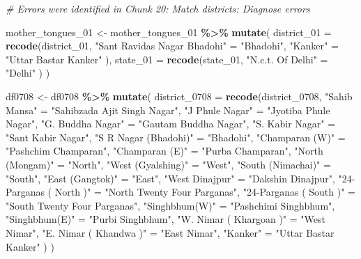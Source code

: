 \documentclass[
]{article}
\newenvironment{Shaded}{\begin{snugshade}}{\end{snugshade}}
\newcommand{\AttributeTok}[1]{\textcolor[rgb]{0.13,0.29,0.53}{#1}}
\newcommand{\CommentTok}[1]{\textcolor[rgb]{0.56,0.35,0.01}{\textit{#1}}}
\newcommand{\FunctionTok}[1]{\textcolor[rgb]{0.13,0.29,0.53}{\textbf{#1}}}
\newcommand{\NormalTok}[1]{#1}
\newcommand{\OtherTok}[1]{\textcolor[rgb]{0.56,0.35,0.01}{#1}}
\newcommand{\SpecialCharTok}[1]{\textcolor[rgb]{0.81,0.36,0.00}{\textbf{#1}}}
\newcommand{\StringTok}[1]{\textcolor[rgb]{0.31,0.60,0.02}{#1}}
\begin{document}
\begin{Shaded}
\begin{Highlighting}[]
\CommentTok{\# Errors were identified in Chunk 20: Match districts: Diagnose errors}

\NormalTok{mother\_tongues\_01 }\OtherTok{\textless{}{-}}\NormalTok{ mother\_tongues\_01 }\SpecialCharTok{\%\textgreater{}\%}
  \FunctionTok{mutate}\NormalTok{(}
    \AttributeTok{district\_01 =} \FunctionTok{recode}\NormalTok{(district\_01,}
      \StringTok{"Sant Ravidas Nagar Bhadohi"} \OtherTok{=} \StringTok{"Bhadohi"}\NormalTok{,}
      \StringTok{"Kanker"} \OtherTok{=} \StringTok{"Uttar Bastar Kanker"}
\NormalTok{      ),}
    \AttributeTok{state\_01 =} \FunctionTok{recode}\NormalTok{(state\_01,}
      \StringTok{"N.c.t. Of Delhi"} \OtherTok{=} \StringTok{"Delhi"}
\NormalTok{      )}
\NormalTok{    )}


\NormalTok{df0708 }\OtherTok{\textless{}{-}}\NormalTok{ df0708 }\SpecialCharTok{\%\textgreater{}\%}
  \FunctionTok{mutate}\NormalTok{(}
    \AttributeTok{district\_0708 =} \FunctionTok{recode}\NormalTok{(district\_0708,}
      \StringTok{"Sahib Mansa"} \OtherTok{=} \StringTok{"Sahibzada Ajit Singh Nagar"}\NormalTok{,}
      \StringTok{"J Phule Nagar"} \OtherTok{=} \StringTok{"Jyotiba Phule Nagar"}\NormalTok{,}
      \StringTok{"G. Buddha Nagar"} \OtherTok{=} \StringTok{"Gautam Buddha Nagar"}\NormalTok{,}
      \StringTok{"S. Kabir Nagar"} \OtherTok{=} \StringTok{"Sant Kabir Nagar"}\NormalTok{,}
      \StringTok{"S R Nagar (Bhadohi)"} \OtherTok{=} \StringTok{"Bhadohi"}\NormalTok{,}
      \StringTok{"Champaran (W)"} \OtherTok{=} \StringTok{"Pashchim Champaran"}\NormalTok{,}
      \StringTok{"Champaran (E)"} \OtherTok{=} \StringTok{"Purba Champaran"}\NormalTok{,}
      \StringTok{"North (Mongam)"} \OtherTok{=} \StringTok{"North"}\NormalTok{,}
      \StringTok{"West (Gyalshing)"} \OtherTok{=} \StringTok{"West"}\NormalTok{,}
      \StringTok{"South (Nimachai)"} \OtherTok{=} \StringTok{"South"}\NormalTok{,}
      \StringTok{"East (Gangtok)"} \OtherTok{=} \StringTok{"East"}\NormalTok{,}
      \StringTok{"West Dinajpur"} \OtherTok{=} \StringTok{"Dakshin Dinajpur"}\NormalTok{,}
      \StringTok{"24{-}Parganas ( North )"} \OtherTok{=} \StringTok{"North Twenty Four Parganas"}\NormalTok{,}
      \StringTok{"24{-}Parganas ( South )"} \OtherTok{=} \StringTok{"South Twenty Four Parganas"}\NormalTok{,}
      \StringTok{"Singhbhum(W)"} \OtherTok{=} \StringTok{"Pashchimi Singhbhum"}\NormalTok{,}
      \StringTok{"Singhbhum(E)"} \OtherTok{=} \StringTok{"Purbi Singhbhum"}\NormalTok{,}
      \StringTok{"W. Nimar ( Khargoan )"} \OtherTok{=} \StringTok{"West Nimar"}\NormalTok{,}
      \StringTok{"E. Nimar ( Khandwa )"} \OtherTok{=} \StringTok{"East Nimar"}\NormalTok{,}
      \StringTok{"Kanker"} \OtherTok{=} \StringTok{"Uttar Bastar Kanker"}
\NormalTok{      )}
\NormalTok{    )}



\end{Highlighting}
\end{Shaded}
\end{document}
